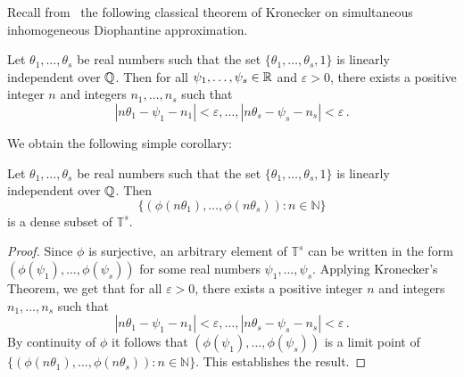 Recall from~\cite{HardyAndWright} the following classical theorem of
Kronecker on simultaneous inhomogeneous Diophantine approximation.
\begin{theorem}[Kronecker]
  Let $\theta_1,\ldots,\theta_s$ be real numbers such that the set
  $\{\theta_1,\ldots,\theta_s,1\}$ is linearly independent over
  $\mathbb{Q}$.  Then for all $\psi_1,\ldots,\psi_s \in \mathbb{R}$
  and $\varepsilon > 0$, there exists a positive integer $n$
and integers $n_1,\ldots,n_s$ such that
\[ |n\theta_1 - \psi_1 - n_1| < \varepsilon, \ldots ,
   |n\theta_s - \psi_s - n_s| < \varepsilon \, .\]
\end{theorem}

We obtain the following simple corollary:
\begin{corollary}
  Let $\theta_1,\ldots,\theta_s$ be real numbers such that the set
  $\{ \theta_1,\ldots,\theta_s,1\}$ is linearly independent over
  $\mathbb{Q}$.  Then
\[ \{ (\phi(n\theta_1),\ldots,\phi(n\theta_s)) : n \in \mathbb{N} \} \]
is a dense subset of $\mathbb{T}^s$.
\label{corl:kronecker}
\end{corollary}
\begin{proof}
  Since $\phi$ is surjective, an arbitrary element of $\mathbb{T}^s$
  can be written in the form $(\phi(\psi_1),\ldots,\phi(\psi_s))$ for
  some real numbers $\psi_1,\ldots,\psi_s$.
Applying Kronecker's Theorem, we get that
for all $\varepsilon > 0$, there exists a positive integer $n$
and integers $n_1,\ldots,n_s$ such that
\[ |n\theta_1 - \psi_1 - n_1| < \varepsilon, \ldots , |n\theta_s
  - \psi_s - n_s| < \varepsilon \, .\] By continuity of $\phi$ it
follows that $(\phi(\psi_1),\ldots,\phi(\psi_s))$ is a limit point of
$ \{ (\phi(n\theta_1),\ldots,\phi(n\theta_s)) : n \in \mathbb{N} \}$.
This establishes the result.
\end{proof}
